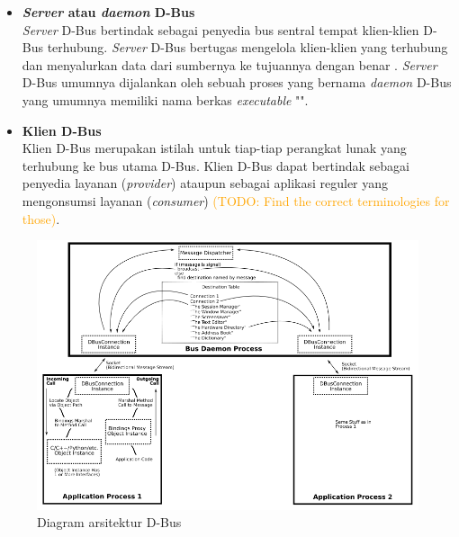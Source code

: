 \begin{itemize}
    \item \textbf{\textit{Server} atau \textit{daemon} D-Bus}\\
    \textit{Server} D-Bus bertindak sebagai penyedia bus sentral tempat klien-klien D-Bus terhubung. \textit{Server} D-Bus bertugas mengelola klien-klien yang terhubung dan menyalurkan data dari sumbernya ke tujuannya dengan benar \cite{qt-introduction-to-dbus}. \textit{Server} D-Bus umumnya dijalankan oleh sebuah proses yang bernama \textit{daemon} D-Bus yang umumnya memiliki nama berkas \textit{executable} "".

    \item \textbf{Klien D-Bus}\\
    Klien D-Bus merupakan istilah untuk tiap-tiap perangkat lunak yang terhubung ke bus utama D-Bus. Klien D-Bus dapat bertindak sebagai penyedia layanan (\textit{provider}) ataupun sebagai aplikasi reguler yang mengonsumsi layanan (\textit{consumer}) \textcolor{orange}{(TODO: Find the correct terminologies for those)}.
\end{itemize}

\begin{figure}
    \centering
    \includegraphics[width=1\linewidth]{contents//chapter-2/dbus-diagram.png}
    \caption{Diagram arsitektur D-Bus \cite{dbus-main-project-page}}
    \label{fig:enter-label}
\end{figure}

